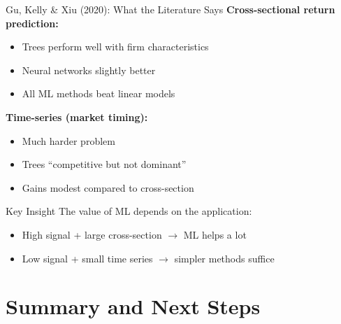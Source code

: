 \documentclass[10pt]{beamer}
\begin{document}
\begin{frame}{Gu, Kelly \& Xiu (2020): What the Literature Says}
  \textbf{Cross-sectional return prediction:}
  \begin{itemize}
    \item Trees perform well with firm characteristics
    \item Neural networks slightly better
    \item All ML methods beat linear models
  \end{itemize}

  \vspace{0.5em}
  \textbf{Time-series (market timing):}
  \begin{itemize}
    \item Much harder problem
    \item Trees ``competitive but not dominant''
    \item Gains modest compared to cross-section
  \end{itemize}

  \vspace{0.5em}
  \begin{block}{Key Insight}
    The value of ML depends on the application:
    \begin{itemize}
      \item High signal + large cross-section $\to$ ML helps a lot
      \item Low signal + small time series $\to$ simpler methods suffice
    \end{itemize}
  \end{block}
\end{frame}

\section{Summary and Next Steps}
\end{document}
